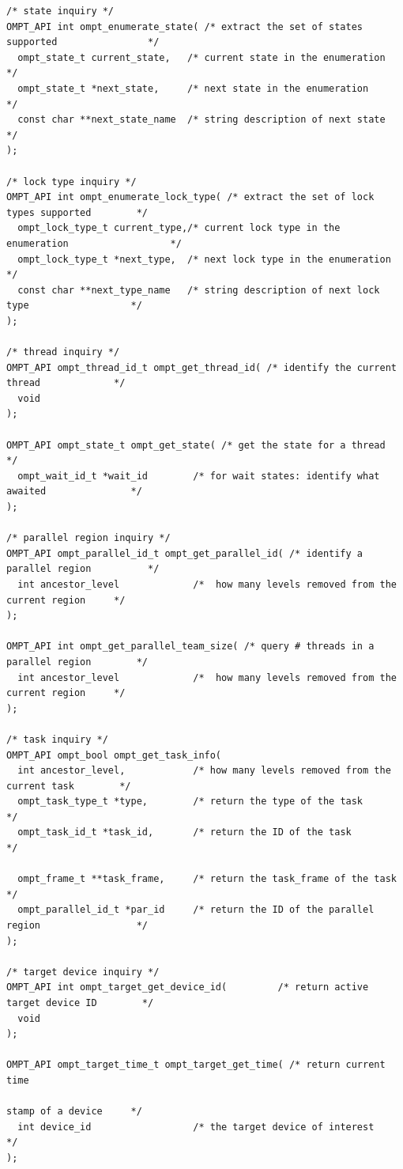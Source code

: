 \documentclass{article}
\begin{document}
{\begin{verbatim}
/* state inquiry */
OMPT_API int ompt_enumerate_state( /* extract the set of states supported                */
  ompt_state_t current_state,   /* current state in the enumeration                      */
  ompt_state_t *next_state,     /* next state in the enumeration                         */
  const char **next_state_name  /* string description of next state                      */
);

/* lock type inquiry */
OMPT_API int ompt_enumerate_lock_type( /* extract the set of lock types supported        */
  ompt_lock_type_t current_type,/* current lock type in the enumeration                  */
  ompt_lock_type_t *next_type,  /* next lock type in the enumeration                     */
  const char **next_type_name   /* string description of next lock type                  */
);

/* thread inquiry */
OMPT_API ompt_thread_id_t ompt_get_thread_id( /* identify the current thread             */
  void
);

OMPT_API ompt_state_t ompt_get_state( /* get the state for a thread                      */
  ompt_wait_id_t *wait_id        /* for wait states: identify what awaited               */
);

/* parallel region inquiry */
OMPT_API ompt_parallel_id_t ompt_get_parallel_id( /* identify a parallel region          */
  int ancestor_level             /*  how many levels removed from the current region     */
);

OMPT_API int ompt_get_parallel_team_size( /* query # threads in a parallel region        */
  int ancestor_level             /*  how many levels removed from the current region     */
);

/* task inquiry */
OMPT_API ompt_bool ompt_get_task_info(
  int ancestor_level,            /* how many levels removed from the current task        */
  ompt_task_type_t *type,        /* return the type of the task                          */
  ompt_task_id_t *task_id,       /* return the ID of the task                            */
  
  ompt_frame_t **task_frame,     /* return the task_frame of the task                    */
  ompt_parallel_id_t *par_id     /* return the ID of the parallel region                 */
);

/* target device inquiry */
OMPT_API int ompt_target_get_device_id(         /* return active target device ID        */
  void
);

OMPT_API ompt_target_time_t ompt_target_get_time( /* return current time
                                                                   stamp of a device     */
  int device_id                  /* the target device of interest                        */
);


\end{verbatim}}
\end{document}
